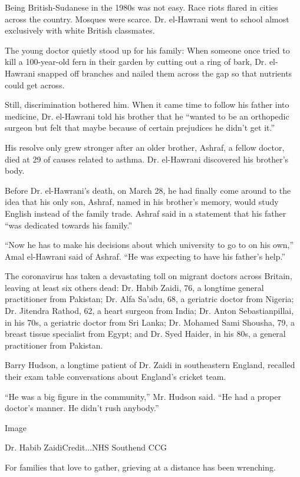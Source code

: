 Being British-Sudanese in the 1980s was not easy. Race riots flared in
cities across the country. Mosques were scarce. Dr. el-Hawrani went to
school almost exclusively with white British classmates.

The young doctor quietly stood up for his family: When someone once
tried to kill a 100-year-old fern in their garden by cutting out a ring
of bark, Dr. el-Hawrani snapped off branches and nailed them across the
gap so that nutrients could get across.

Still, discrimination bothered him. When it came time to follow his
father into medicine, Dr. el-Hawrani told his brother that he ``wanted
to be an orthopedic surgeon but felt that maybe because of certain
prejudices he didn't get it.''

His resolve only grew stronger after an older brother, Ashraf, a fellow
doctor, died at 29 of causes related to asthma. Dr. el-Hawrani
discovered his brother's body.

Before Dr. el-Hawrani's death, on March 28, he had finally come around
to the idea that his only son, Ashraf, named in his brother's memory,
would study English instead of the family trade. Ashraf said in a
statement that his father ``was dedicated towards his family.''

``Now he has to make his decisions about which university to go to on
his own,'' Amal el-Hawrani said of Ashraf. ``He was expecting to have
his father's help.''

The coronavirus has taken a devastating toll on migrant doctors across
Britain, leaving at least six others dead: Dr. Habib Zaidi, 76, a
longtime general practitioner from Pakistan; Dr. Alfa Sa'adu, 68, a
geriatric doctor from Nigeria; Dr. Jitendra Rathod, 62, a heart surgeon
from India; Dr. Anton Sebastianpillai, in his 70s, a geriatric doctor
from Sri Lanka; Dr. Mohamed Sami Shousha, 79, a breast tissue specialist
from Egypt; and Dr. Syed Haider, in his 80s, a general practitioner from
Pakistan.

Barry Hudson, a longtime patient of Dr. Zaidi in southeastern England,
recalled their exam table conversations about England's cricket team.

``He was a big figure in the community,'' Mr. Hudson said. ``He had a
proper doctor's manner. He didn't rush anybody.''

Image

Dr. Habib ZaidiCredit...NHS Southend CCG

For families that love to gather, grieving at a distance has been
wrenching.

